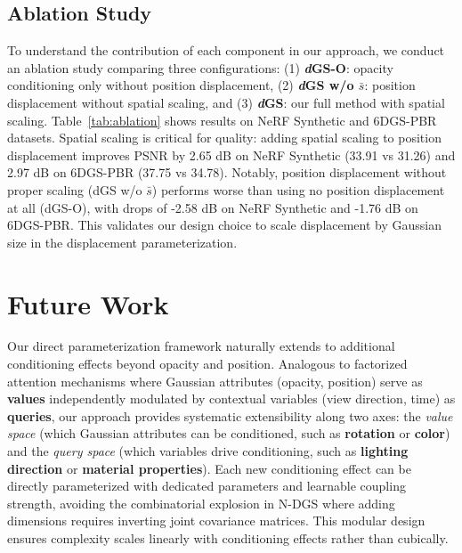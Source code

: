 \documentclass{article}
\theoremstyle{plain}
\theoremstyle{definition}
\theoremstyle{remark}
\begin{document}
\subsection{Ablation Study}

To understand the contribution of each component in our approach, we conduct an ablation study comparing three configurations: (1) \textbf{\textit{d}GS-O}: opacity conditioning only without position displacement, (2) \textbf{\textit{d}GS w/o $\bar{s}$}: position displacement without spatial scaling, and (3) \textbf{\textit{d}GS}: our full method with spatial scaling. Table~\ref{tab:ablation} shows results on NeRF Synthetic and 6DGS-PBR datasets. Spatial scaling is critical for quality: adding spatial scaling to position displacement improves PSNR by 2.65 dB on NeRF Synthetic (33.91 vs 31.26) and 2.97 dB on 6DGS-PBR (37.75 vs 34.78). Notably, position displacement without proper scaling (dGS w/o $\bar{s}$) performs worse than using no position displacement at all (dGS-O), with drops of -2.58 dB on NeRF Synthetic and -1.76 dB on 6DGS-PBR. This validates our design choice to scale displacement by Gaussian size in the displacement parameterization.

\section{Future Work}

Our direct parameterization framework naturally extends to additional conditioning effects beyond opacity and position. Analogous to factorized attention mechanisms where Gaussian attributes (opacity, position) serve as \textbf{values} independently modulated by contextual variables (view direction, time) as \textbf{queries}, our approach provides systematic extensibility along two axes: the \textit{value space} (which Gaussian attributes can be conditioned, such as \textbf{rotation} or \textbf{color}) and the \textit{query space} (which variables drive conditioning, such as \textbf{lighting direction} or \textbf{material properties}). Each new conditioning effect can be directly parameterized with dedicated parameters and learnable coupling strength, avoiding the combinatorial explosion in N-DGS where adding dimensions requires inverting joint covariance matrices. %
This modular design ensures complexity scales linearly with conditioning effects rather than cubically.
\end{document}
